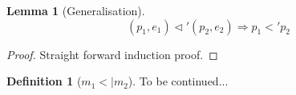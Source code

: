 \documentclass[a4paper, oneside, draft]{memoir}
\theoremstyle{definition}
\newtheorem{definition}{Definition}
\newtheorem{lemma}{Lemma}
\begin{document}
\begin{lemma}[Generalisation]
  \[
  (p_1, e_1) \lhd' (p_2, e_2) \Rightarrow p_1 <' p_2
  \]
\end{lemma}
\begin{proof}
  Straight forward induction proof.
\end{proof}

\begin{definition}[$m_1 <| m_2$]
To be continued...
\end{definition}





\end{document}
